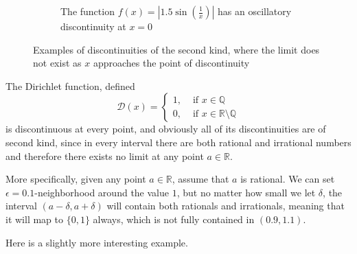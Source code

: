 \begin{definition}
\begin{figure}[H]
\begin{subfigure}[b]{0.48\textwidth}
        \caption{The function $f(x) = |1.5 \sin\left(\frac{1}{x}\right)|$ has an oscillatory discontinuity at $x=0$}
        \label{fig:oscillatory-discontinuity}
      \end{subfigure}
      \caption{Examples of discontinuities of the second kind, where the limit does not exist as $x$ approaches the point of discontinuity}
      \label{fig:second-kind-discontinuities}
    \end{figure}
  \end{definition}

  \begin{example}
    \label{ex:dirichlet-function}
    The Dirichlet function, defined
    \begin{equation}
      \mathcal{D}(x) = \begin{cases}
      1, & \text{ if } x \in \mathbb{Q} \\
      0, & \text{ if } x \in \mathbb{R} \setminus \mathbb{Q} 
      \end{cases}
    \end{equation}
    is discontinuous at every point, and obviously all of its discontinuities are of second kind, since in every interval there are both rational and irrational numbers and therefore there exists no limit at any point $a \in \mathbb{R}$. 

    More specifically, given any point $a \in \mathbb{R}$, assume that $a$ is rational. We can set $\epsilon = 0.1$-neighborhood around the value $1$, but no matter how small we let $\delta$, the interval $(a - \delta, a + \delta)$ will contain both rationals and irrationals, meaning that it will map to $\{0,1\}$ always, which is not fully contained in $(0.9, 1.1)$.  
  \end{example}

  Here is a slightly more interesting example. 

